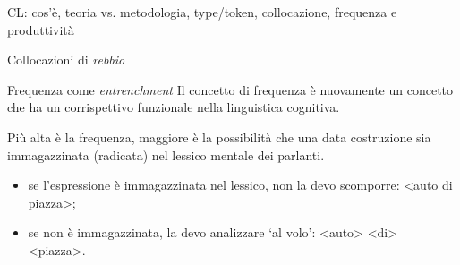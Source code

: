 \documentclass[pdf]{prosper}
\begin{document}
\begin{tsectionandpart}{CL: cos'è, teoria vs. metodologia, type/token, collocazione, frequenza e produttività}
{\begin{slide}{Collocazioni di {\it rebbio}}
\end{slide}
}


\begin{slide}{Frequenza come {\it entrenchment}}
	Il concetto di frequenza è nuovamente un concetto che ha un corrispettivo funzionale nella linguistica cognitiva.
	
	Più alta è la frequenza, maggiore è la possibilità che una data costruzione sia immagazzinata (radicata) nel lessico mentale dei parlanti.

	\begin{itemize}
		\item se l'espressione è immagazzinata nel lessico, non la devo scomporre: <auto di piazza>;
		\item se non è immagazzinata, la devo analizzare `al volo': <auto> <di> <piazza>.

	\end{itemize}
\end{slide}

\end{tsectionandpart}
\end{document}
